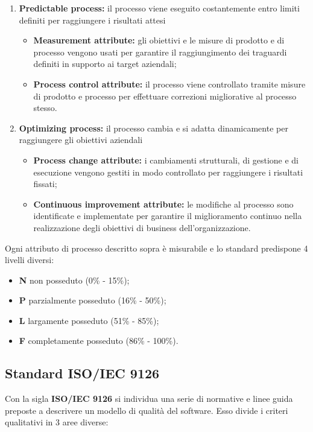 \begin{flushleft}
\begin{enumerate}[label*=\arabic*]
	\item \textbf{Predictable process:} il processo viene eseguito costantemente entro limiti definiti per raggiungere i risultati attesi
		\begin{itemize}
			\item\textbf{Measurement attribute:} gli obiettivi e le misure di prodotto e di processo vengono usati per garantire il raggiungimento dei traguardi definiti in supporto ai target aziendali;
			\item \textbf{Process control attribute:} il processo viene controllato tramite misure di prodotto e processo per effettuare correzioni migliorative al processo stesso.
		\end{itemize}
		
\item \textbf{Optimizing process:} il processo cambia e si adatta dinamicamente per raggiungere gli obiettivi aziendali
		\begin{itemize}
			\item \textbf{Process change attribute:} i cambiamenti strutturali, di gestione e di esecuzione vengono gestiti in modo controllato per raggiungere i risultati fissati;
			\item \textbf{Continuous improvement attribute:} le modifiche al processo sono identificate e implementate per garantire il miglioramento continuo nella realizzazione degli obiettivi di business dell'organizzazione.
		\end{itemize}

\end{enumerate}

Ogni attributo di processo descritto sopra è misurabile e lo standard predispone 4 livelli diversi:
\begin{itemize}[label={}]
	\item \textbf{N} non posseduto (0\% - 15\%);
	\item \textbf{P} parzialmente posseduto (16\% - 50\%);
	\item \textbf{L} largamente posseduto (51\% - 85\%);
	\item \textbf{F} completamente posseduto (86\% - 100\%).
\end{itemize}

\subsection{Standard ISO/IEC 9126} \label{9126}

Con la sigla \textbf{ISO/IEC 9126} si individua una serie di normative e linee guida preposte a descrivere un modello di qualità del software.
Esso divide i criteri qualitativi in 3 aree diverse:
\begin{itemize}


\end{itemize}
\end{flushleft}
